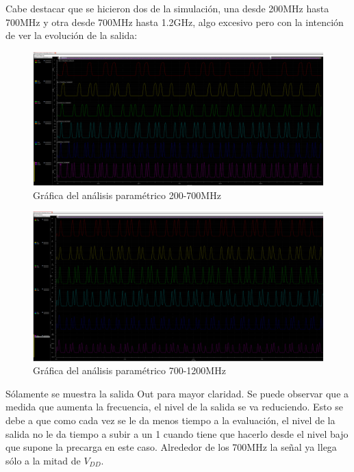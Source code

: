 Cabe destacar que se hicieron dos  de la simulación, una desde 200MHz hasta 700MHz y otra desde 700MHz hasta 1.2GHz, algo excesivo pero con la intención de ver la evolución de la salida:
\begin{figure}[H]%
\begin {center}
\includegraphics[width=1.1\textwidth]{figures/ParamFreqGraphNOVALIDO.PNG}
\caption{Gráfica del análisis paramétrico 200-700MHz}
\label{fig:GraphFreq1}
\end {center}
\end{figure} 
\vspace{-1cm}
\begin{figure}[H]%
\begin {center}
\includegraphics[width=1.1\textwidth]{figures/ParamFreqGraph2.PNG}
\caption{Gráfica del análisis paramétrico 700-1200MHz}
\label{fig:GraphFreq2}
\end {center}
\end{figure} 
Sólamente se muestra la salida Out para mayor claridad. Se puede observar que a medida que aumenta la frecuencia, el nivel de la salida se va reduciendo. Esto se debe a que como cada vez se le da menos tiempo a la evaluación, el nivel de la salida no le da tiempo a subir a un 1 cuando tiene que hacerlo desde el nivel bajo que supone la precarga en este caso. Alrededor de los 700MHz la señal ya llega sólo a la mitad de $V_{DD}$.

